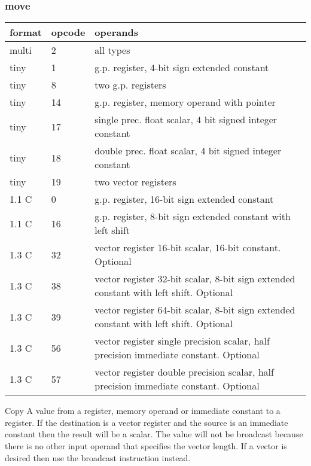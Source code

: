 \documentclass[forwardcom.tex]{subfiles}
\begin{document}
\subsubsection{move}
\label{table:moveInstruction}
\begin{tabular}{|p{12mm}|p{12mm}|p{110mm}|}
\hline
\bfseries format & \bfseries opcode & \bfseries operands \\ \hline
multi & 2 & all types \\ \hline

tiny  & 1 & g.p. register, 4-bit sign extended constant \\ \hline
tiny  & 8 & two g.p. registers \\ \hline
tiny  & 14 & g.p. register, memory operand with pointer \\ \hline
tiny  & 17 & single prec. float scalar, 4 bit signed integer constant \\ \hline
tiny  & 18 & double prec. float scalar, 4 bit signed integer constant \\ \hline
tiny  & 19 & two vector registers \\ \hline
1.1 C &  0 & g.p. register, 16-bit sign extended constant \\ \hline
1.1 C & 16 & g.p. register, 8-bit sign extended constant with left shift \\ \hline
1.3 C & 32 & vector register 16-bit scalar, 16-bit constant. Optional  \\ \hline
1.3 C & 38 & vector register 32-bit scalar, 8-bit sign extended constant with left shift. Optional \\ \hline
1.3 C & 39 & vector register 64-bit scalar, 8-bit sign extended constant with left shift. Optional \\ \hline
1.3 C & 56 & vector register single precision scalar, half precision immediate constant. Optional \\ \hline
1.3 C & 57 & vector register double precision scalar, half precision immediate constant. Optional \\ \hline
\end{tabular}
\vspace{2mm}

Copy A value from a register, memory operand or immediate constant to a register. If the destination is a vector register and the source is an immediate constant then the result will be a scalar. The value will not be broadcast because there is no other input operand that specifies the vector length. If a vector is desired then use the broadcast instruction instead.
\vspace{2mm}
\end{document}
